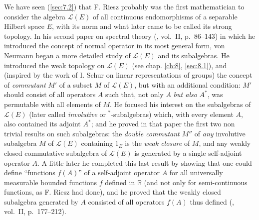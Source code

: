 \documentclass[12pt,a4paper,leqno,twoside]{extbook}
\newcommand{\R}{\mathbb{R}}
\begin{document}
We have seen (\ref{sec:7.2}) that F. Riesz probably was the first mathematician to consider the algebra \(\mathcal{L}(E)\) of all continuous endomorphisms of a separable Hilbert space \(E\), with its norm and what later came to be called its strong topology. In his second paper on spectral theory (\cite{221}, vol.~II, p.~86--143) in which he introduced the concept of normal operator in its most general form, von Neumann began a more detailed study of \(\mathcal{L}(E)\) and its subalgebras. He introduced the weak topology on \(\mathcal{L}(E)\) (see chap. \ref{ch:8}, \ref{sec:8.1}), and (inspired by the work of I. Schur on linear representations of groups) the concept of \emph{commutant} \(M'\) of a subset \(M\) of \(\mathcal{L}(E)\), but with an additional condition: \(M'\) should consist of all operators \(A\) such that, not only \(A\) \emph{but also} \(A^*\), was permutable with all elements of \(M\). He focused his interest on the subalgebras of \(\mathcal{L}(E)\) (later called \emph{involutive} or \(^*\)-subalgebras) which, with every element \(A\), also contained its adjoint \(A^*\); and he proved in that paper the first two non trivial results on such subalgebras: the \emph{double commutant} \(M''\) of \emph{any} involutive subalgebra \(M\) of \(\mathcal{L}(E)\) containing \(1_E\) is the \emph{weak closure} of \(M\), and any weakly closed commutative subalgebra of \(\mathcal{L}(E)\) is generated by a single self-adjoint operator \(A\). A little later he completed this last result by showing that one could define ``functions \(f(A)\)'' of a self-adjoint operator \(A\) for all universally measurable bounded functions \(f\) defined in \(\R\) (and not only for semi-continuous functions, as F. Riesz had done), and he proved that the weakly closed subalgebra generated by \(A\) consisted of all operators \(f(A)\) thus defined (\cite{221}, vol.~II, p.~177--212).
\end{document}
